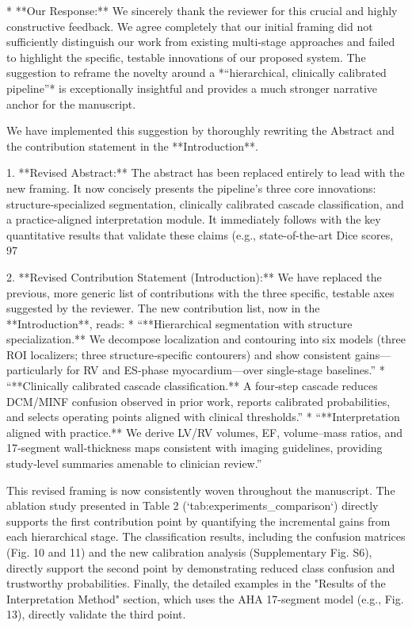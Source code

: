 *   **Our Response:** We sincerely thank the reviewer for this crucial and highly constructive feedback. We agree completely that our initial framing did not sufficiently distinguish our work from existing multi-stage approaches and failed to highlight the specific, testable innovations of our proposed system. The suggestion to reframe the novelty around a *“hierarchical, clinically calibrated pipeline”* is exceptionally insightful and provides a much stronger narrative anchor for the manuscript.

    We have implemented this suggestion by thoroughly rewriting the Abstract and the contribution statement in the **Introduction**.

    1.  **Revised Abstract:** The abstract has been replaced entirely to lead with the new framing. It now concisely presents the pipeline's three core innovations: structure-specialized segmentation, clinically calibrated cascade classification, and a practice-aligned interpretation module. It immediately follows with the key quantitative results that validate these claims (e.g., state-of-the-art Dice scores, 97%

    2.  **Revised Contribution Statement (Introduction):** We have replaced the previous, more generic list of contributions with the three specific, testable axes suggested by the reviewer. The new contribution list, now in the **Introduction**, reads:
        *   “**Hierarchical segmentation with structure specialization.** We decompose localization and contouring into six models (three ROI localizers; three structure‑specific contourers) and show consistent gains—particularly for RV and ES‑phase myocardium—over single‑stage baselines.”
        *   “**Clinically calibrated cascade classification.** A four‑step cascade reduces DCM/MINF confusion observed in prior work, reports calibrated probabilities, and selects operating points aligned with clinical thresholds.”
        *   “**Interpretation aligned with practice.** We derive LV/RV volumes, EF, volume–mass ratios, and 17‑segment wall‑thickness maps consistent with imaging guidelines, providing study‑level summaries amenable to clinician review.”

    This revised framing is now consistently woven throughout the manuscript. The ablation study presented in Table 2 (`tab:experiments_comparison`) directly supports the first contribution point by quantifying the incremental gains from each hierarchical stage. The classification results, including the confusion matrices (Fig. 10 and 11) and the new calibration analysis (Supplementary Fig. S6), directly support the second point by demonstrating reduced class confusion and trustworthy probabilities. Finally, the detailed examples in the "Results of the Interpretation Method" section, which uses the AHA 17-segment model (e.g., Fig. 13), directly validate the third point.

